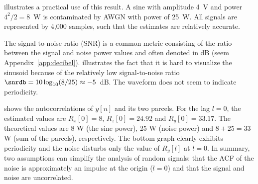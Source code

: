  illustrates a practical use of this result. A sine with amplitude 4~V and power $4^2/2=8$~W is contaminated by AWGN with power of 25~W. All signals are represented by 4,000 samples, such that the estimates are relatively accurate.

The signal-to-noise ratio (SNR) is a common metric
consisting of the ratio between the signal and noise power values and often denoted in dB (seem Appendix~\ref{app:decibel}).
 illustrates the fact that it is hard to visualize the sinusoid because of the relatively low signal-to-noise ratio $\snrdb=10 \log_{10}(8/25) \approx -5$~dB. The waveform does not seem to indicate periodicity.

 shows the autocorrelations of $y[n]$ and its two parcels. For the lag $l=0$, the estimated values are $R_x[0]=8$, $R_z[0]=24.92$ and $R_y[0]=33.17$. The theoretical values are 8 W (the sine power), 25 W (noise power) and $8+25=33$ W (sum of the parcels), respectively. The bottom graph clearly exhibits periodicity and the noise disturbs only the value of $R_y[l]$ at $l=0$. In summary, two assumptions can simplify the analysis of random signals: that the ACF of the noise is approximately an impulse at the origin ($l=0$) and that the signal and noise are uncorrelated.\eExample



